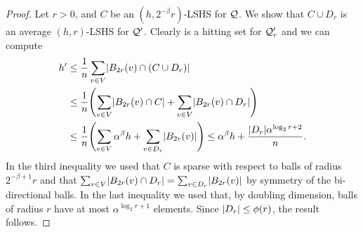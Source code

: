 \begin{proof}
Let $r>0$, and $C$ be an $(h,2^{-\beta}r)$-LSHS for $\mathcal{Q}$.
We show that $C\cup D_r$ is an average $(h,r)$-LSHS for $\mathcal{Q}'$.
Clearly is a hitting set for $\mathcal{Q}'_r$ and we can compute
\begin{align*}
h'&\leq \frac{1}{n}\sum_{v\in V} \abs{B_{2r}(v)\cap (C\cup D_r)}\\
&\leq \frac{1}{n}\prn*{\sum_{v\in V} \abs{B_{2r}(v)\cap C}+\sum_{v\in V} \abs{B_{2r}(v)\cap D_r}}\\
&\leq \frac{1}{n}\prn*{\sum_{v\in V} \alpha^\beta h+\sum_{v\in D_r} \abs{B_{2r}(v)}}
\leq \alpha^\beta h + \frac{\abs{D_r}\alpha^{\log_2r+2}}{n}.
\end{align*}
In the third inequality we used that $C$ is sparse with respect to balls of radius $2^{-\beta+1}r$ and that $\sum_{v\in V} \lvert B_{2r}(v)\cap D_r\rvert=\sum_{v\in D_r} \lvert B_{2r}(v)\rvert$ by symmetry of the bi-directional balls.
In the last inequality we used that, by doubling dimension, balls of radius $r$ have at most $\alpha^{\log_2r+1}$ elements.
Since $\lvert D_r\rvert\leq \phi(r)$, the result follows.
\end{proof}


